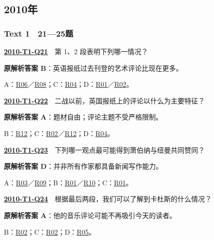 \documentclass[11pt,a4paper]{article}
\begin{document}
\subsection{2010年}\label{year-2010}
\subsubsection{Text 1　21—25题}
\label{idx-2010-T1-Q21}\noindent\textbf{\href{https://zj139.github.io/math-notes/english/bfa65806b0e493e64d7761c2/\#q21}{2010-T1-Q21}}　第 1、2 段表明下列哪一情况？\par\nopagebreak
\noindent\textbf{原解析答案 B}：英语报纸过去刊登的艺术评论比现在更多。\par\nopagebreak
\noindent A：\hyperref[cat-R06]{R06}／\hyperref[cat-R08]{R08}；C：\hyperref[cat-R04]{R04}；D：\hyperref[cat-R01]{R01}／\hyperref[cat-R02]{R02}。\par\smallskip
{}\label{idx-2010-T1-Q22}\noindent\textbf{\href{https://zj139.github.io/math-notes/english/bfa65806b0e493e64d7761c2/\#q22}{2010-T1-Q22}}　二战以前，英国报纸上的评论以什么为主要特征？\par\nopagebreak
\noindent\textbf{原解析答案 A}：题材自由；评论主题不受严格限制。\par\nopagebreak
\noindent B：\hyperref[cat-R12]{R12}；C：\hyperref[cat-R02]{R02}／\hyperref[cat-R12]{R12}；D：\hyperref[cat-R04]{R04}。\par\smallskip
{}\label{idx-2010-T1-Q23}\noindent\textbf{\href{https://zj139.github.io/math-notes/english/bfa65806b0e493e64d7761c2/\#q23}{2010-T1-Q23}}　下列哪一观点最可能得到萧伯纳与纽曼共同赞同？\par\nopagebreak
\noindent\textbf{原解析答案 D}：并非所有作家都具备新闻写作能力。\par\nopagebreak
\noindent A：\hyperref[cat-R03]{R03}／\hyperref[cat-R09]{R09}；B：\hyperref[cat-R01]{R01}／\hyperref[cat-R10]{R10}；C：\hyperref[cat-R01]{R01}。\par\smallskip
{}\label{idx-2010-T1-Q24}\noindent\textbf{\href{https://zj139.github.io/math-notes/english/bfa65806b0e493e64d7761c2/\#q24}{2010-T1-Q24}}　根据最后两段，我们可以了解到卡杜斯的什么情况？\par\nopagebreak
\noindent\textbf{原解析答案 A}：他的音乐评论可能不再吸引今天的读者。\par\nopagebreak
\noindent B：\hyperref[cat-R02]{R02}；C：\hyperref[cat-R02]{R02}；D：\hyperref[cat-R05]{R05}。\par\smallskip
\end{document}
